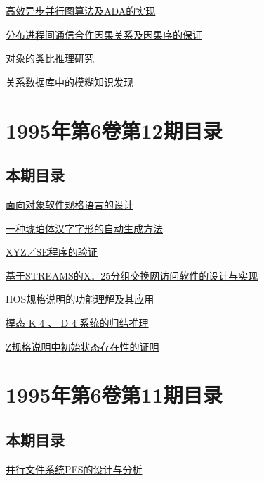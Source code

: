 \documentclass[a4paper]{article}
\begin{document}
\href{http://www.jos.org.cn/ch/reader/download_pdf.aspx?file_no=19950106&year_id=1995&quarter_id=1&falg=1}{高效异步并行图算法及ADA的实现}

\href{http://www.jos.org.cn/ch/reader/download_pdf.aspx?file_no=19950107&year_id=1995&quarter_id=1&falg=1}{分布进程间通信合作因果关系及因果序的保证}

\href{http://www.jos.org.cn/ch/reader/download_pdf.aspx?file_no=19950108&year_id=1995&quarter_id=1&falg=1}{对象的类比推理研究}

\href{http://www.jos.org.cn/ch/reader/download_pdf.aspx?file_no=19950109&year_id=1995&quarter_id=1&falg=1}{关系数据库中的模糊知识发现}


\section{\textbf{1995年第6卷第12期目录}}
\subsection{本期目录}
\href{http://www.jos.org.cn/ch/reader/download_pdf.aspx?file_no=19951201&year_id=1995&quarter_id=12&falg=1}{面向对象软件规格语言的设计}

\href{http://www.jos.org.cn/ch/reader/download_pdf.aspx?file_no=19951202&year_id=1995&quarter_id=12&falg=1}{一种琥珀体汉字字形的自动生成方法}

\href{http://www.jos.org.cn/ch/reader/download_pdf.aspx?file_no=19951203&year_id=1995&quarter_id=12&falg=1}{XYZ／SE程序的验证}

\href{http://www.jos.org.cn/ch/reader/download_pdf.aspx?file_no=19951204&year_id=1995&quarter_id=12&falg=1}{基于STREAMS的X．25分组交换网访问软件的设计与实现}

\href{http://www.jos.org.cn/ch/reader/download_pdf.aspx?file_no=19951205&year_id=1995&quarter_id=12&falg=1}{HOS规格说明的功能理解及其应用}

\href{http://www.jos.org.cn/ch/reader/download_pdf.aspx?file_no=19951206&year_id=1995&quarter_id=12&falg=1}{模态 K 4 、 D 4 系统的归结推理}

\href{http://www.jos.org.cn/ch/reader/download_pdf.aspx?file_no=19951207&year_id=1995&quarter_id=12&falg=1}{Z规格说明中初始状态存在性的证明}


\section{\textbf{1995年第6卷第11期目录}}
\subsection{本期目录}
\href{http://www.jos.org.cn/ch/reader/download_pdf.aspx?file_no=19951101&year_id=1995&quarter_id=11&falg=1}{并行文件系统PFS的设计与分析}
\end{document}
